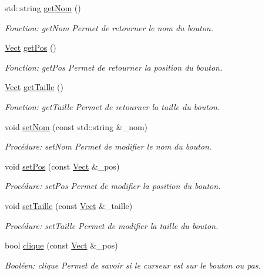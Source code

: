 \begin{DoxyCompactItemize}
std\+::string \hyperlink{classBouton_a84818c161e6ea4ee6d58ccc53d57d802}{get\+Nom} ()
\begin{DoxyCompactList}\small\item\em Fonction\+: get\+Nom Permet de retourner le nom du bouton. \end{DoxyCompactList}\item 
\hyperlink{classVect}{Vect} \hyperlink{classBouton_a98c3ba829a653f51ef8079395bbe061c}{get\+Pos} ()
\begin{DoxyCompactList}\small\item\em Fonction\+: get\+Pos Permet de retourner la position du bouton. \end{DoxyCompactList}\item 
\hyperlink{classVect}{Vect} \hyperlink{classBouton_af8d5683f32e115bd8d709bbfd6965b54}{get\+Taille} ()
\begin{DoxyCompactList}\small\item\em Fonction\+: get\+Taille Permet de retourner la taille du bouton. \end{DoxyCompactList}\item 
void \hyperlink{classBouton_a4bdd74233fa0a3f6fe67d463b75d3f4a}{set\+Nom} (const std\+::string \&\+\_\+nom)
\begin{DoxyCompactList}\small\item\em Procédure\+: set\+Nom Permet de modifier le nom du bouton. \end{DoxyCompactList}\item 
void \hyperlink{classBouton_a393e195ff7d1ff7a5d3c79edc922b0cd}{set\+Pos} (const \hyperlink{classVect}{Vect} \&\+\_\+pos)
\begin{DoxyCompactList}\small\item\em Procédure\+: set\+Pos Permet de modifier la position du bouton. \end{DoxyCompactList}\item 
void \hyperlink{classBouton_a972600e88d0a65431c27bec898fbba36}{set\+Taille} (const \hyperlink{classVect}{Vect} \&\+\_\+taille)
\begin{DoxyCompactList}\small\item\em Procédure\+: set\+Taille Permet de modifier la taille du bouton. \end{DoxyCompactList}\item 
bool \hyperlink{classBouton_a3a5187a073d75fb8afc44704908d5117}{clique} (const \hyperlink{classVect}{Vect} \&\+\_\+pos)
\begin{DoxyCompactList}\small\item\em Booléen\+: clique Permet de savoir si le curseur est sur le bouton ou pas. \end{DoxyCompactList}\end{DoxyCompactItemize}



